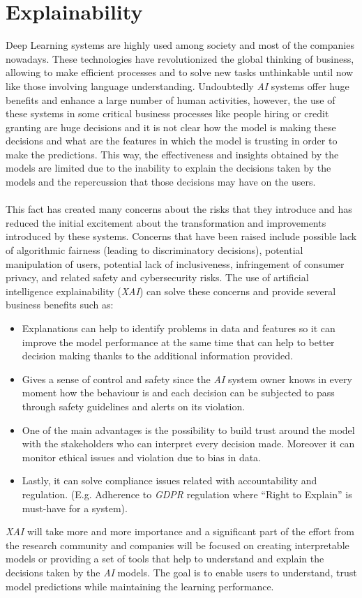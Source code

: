 \section{Explainability}
\label{sec:Explainability}
\noindent Deep Learning systems are highly used among society and most of the companies nowadays. These technologies have revolutionized the global thinking of business, allowing to make efficient processes and to solve new tasks unthinkable until now like those involving language understanding. Undoubtedly \emph{AI} systems offer huge benefits and enhance a large number of human activities, however, the use of these systems in some critical business processes like people hiring or credit granting are huge decisions and it is not clear how the model is making these decisions and what are the features in which the model is trusting in order to make the predictions. This way, the effectiveness and insights obtained by the models are limited due to the inability to explain the decisions taken by the models and the repercussion that those decisions may have on the users.
\paragraph{}
This fact has created many concerns about the risks that they introduce and has reduced the initial excitement about the transformation and improvements introduced by these systems. Concerns that have been raised include possible lack of algorithmic fairness (leading to discriminatory decisions), potential manipulation of users, potential lack of inclusiveness, infringement of consumer privacy, and related safety and cybersecurity risks. The use of artificial intelligence explainability (\emph{XAI}) can solve these concerns and provide several business benefits such as:
\begin{itemize}
\item Explanations can help to identify problems in data and features so it can improve the model performance at the same time that can help to better decision making thanks to the additional information provided.
\item Gives a sense of control and safety since the \emph{AI} system owner knows in every moment how the behaviour is and each decision can be subjected to pass through safety guidelines and alerts on its violation.
\item One of the main advantages is the possibility to build trust around the model with the stakeholders who can interpret every decision made. Moreover it can monitor ethical issues and violation due to bias in data.
\item Lastly, it can solve compliance issues related with accountability and regulation. (E.g. Adherence to \emph{GDPR} regulation where ``Right to Explain'' is must-have for a system).
\end{itemize}
\emph{XAI} will take more and more importance and a significant part of the effort from the research community and companies will be focused on creating interpretable models or providing a set of tools that help to understand and explain the decisions taken by the \emph{AI} models. The goal is to enable users to understand, trust model predictions while maintaining the learning performance.

